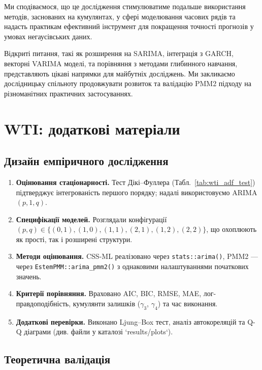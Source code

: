 \documentclass[12pt,a4paper]{article}
\begin{document}
Ми сподіваємося, що це дослідження стимулюватиме подальше використання методів, заснованих на кумулянтах, у сфері моделювання часових рядів та надасть практикам ефективний інструмент для покращення точності прогнозів у умовах негаусівських даних.

Відкриті питання, такі як розширення на SARIMA, інтеграція з GARCH, векторні VARIMA моделі, та порівняння з методами глибинного навчання, представляють цікаві напрямки для майбутніх досліджень. Ми закликаємо дослідницьку спільноту продовжувати розвиток та валідацію PMM2 підходу на різноманітних практичних застосуваннях.

\appendix

\section{WTI: додаткові матеріали}
\label{app:wti_details}

\subsection{Дизайн емпіричного дослідження}

\begin{enumerate}
    \item \textbf{Оцінювання стаціонарності.} Тест Дікі--Фуллера (Табл.~\ref{tab:wti_adf_test}) підтверджує інтегрованість першого порядку; надалі використовуємо ARIMA$(p,1,q)$.
    \item \textbf{Специфікації моделей.} Розглядали конфігурації $(p,q) \in \{(0,1), (1,0), (1,1), (2,1), (1,2), (2,2)\}$, що охоплюють як прості, так і розширені структури.
    \item \textbf{Методи оцінювання.} CSS-ML реалізовано через \texttt{stats::arima()}, PMM2 --- через \texttt{EstemPMM::arima\_pmm2()} з однаковими налаштуваннями початкових значень.
    \item \textbf{Критерії порівняння.} Враховано AIC, BIC, RMSE, MAE, лог-правдоподібність, кумулянти залишків ($\gamma_3$, $\gamma_4$) та час виконання.
    \item \textbf{Додаткові перевірки.} Виконано Ljung--Box тест, аналіз автокореляцій та Q-Q діаграми (див. файли у каталозі `results/plots`).
\end{enumerate}

\subsection{Теоретична валідація}
\end{document}
